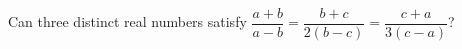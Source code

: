 Can three distinct real numbers satisfy $\dfrac{a+b}{a-b}=\dfrac{b+c}{2(b-c)}=\dfrac{c+a}{3(c-a)}$?
